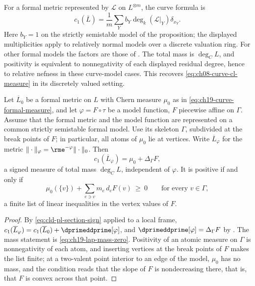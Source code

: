 For a formal metric represented by $\mathcal L$ on $L^{\otimes m}$,
the curve formula is
\begin{equation}
\label{eq:ch19-curve-formal-measure}
 c_1(\overline L)
    =\frac1m\sum_Yb_Y\deg_k(\mathcal L|_Y)\delta_{x_Y}.
\end{equation}
Here $b_Y=1$ on the strictly semistable model of the proposition;
the displayed multiplicities apply to relatively normal models
over a discrete valuation ring.  For other formal models the
factors are those of .
The total mass is $\deg_C L$, and positivity is equivalent to
nonnegativity of each displayed residual degree, hence to relative
nefness in these curve-model cases.  This recovers
\eqref{eq:ch08-curve-cl-measure} in its discretely valued setting.

\begin{proposition}
\label{prop:ch19-curve-model-curvature}
Let $\overline L_0$ be a formal metric on $L$ with Chern measure
$\mu_0$ as in \eqref{eq:ch19-curve-formal-measure}, and let
$\varphi=F\circ\tau$ be a model function, $F$ piecewise affine on
$\Gamma$.  Assume that the formal metric and the model function are
represented on a common strictly semistable formal model.
Use its skeleton $\Gamma$, subdivided at the break points of $F$;
in particular, all atoms of $\mu_0$ lie at vertices.  Write $\overline L_\varphi$ for the metric
$\|\cdot\|_\varphi=\rme^{-\varphi}\|\cdot\|_0$.  Then
\[
 c_1(\overline L_\varphi)=\mu_0+\Delta_\Gamma F ,
\]
a signed measure of total mass $\deg_CL$, independent of $\varphi$.  It
is positive if and only if
\[
 \mu_0(\{v\})+\sum_{e\ni v}m_e\,d_eF(v)\ \geq\ 0
 \qquad\text{for every }v\in\Gamma ,
\]
a finite list of linear inequalities in the vertex values of $F$.
\end{proposition}

\begin{proof}
By \eqref{eq:cld-pl-section-sign} applied to a local frame,
$c_1(\overline L_\varphi)=c_1(\overline L_0)+\dprimeddprime[\varphi]$, and
$\dprimeddprime[\varphi]=\Delta_\Gamma F$ by
.  The mass statement is
\eqref{eq:ch19-lap-mass-zero}.  Positivity of an atomic measure on $\Gamma$
is nonnegativity of each atom, and inserting vertices at the break points of
$F$ makes the list finite; at a two-valent point interior to an edge of the
model, $\mu_0$ has no mass, and the condition reads that the slope of $F$ is
nondecreasing there, that is, that $F$ is convex across that point.
\end{proof}

